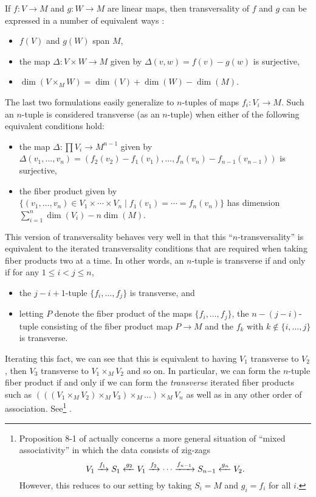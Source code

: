 \begin{remark}
	If $f \colon V \to M$ and $g \colon W \to M$ are linear maps, then transversality of $f$ and $g$ can be expressed in a number of equivalent ways \cite[Section 4.7]{RamBas09}:
	\begin{itemize}
		\item $f(V)$ and $g(W)$ span $M$,
		\item the map $\Delta \colon V \times W \to M$ given by $\Delta(v,w) = f(v)-g(w)$ is surjective,
		\item $\dim(V \times _MW) = \dim(V)+\dim(W)-\dim(M)$.
	\end{itemize}
	The last two formulations easily generalize to $n$-tuples of maps $f_i \colon V_i \to M$.
	Such an $n$-tuple is considered transverse (as an $n$-tuple) when either of the following equivalent conditions hold:
	\begin{itemize}
		\item the map $\Delta \colon \prod V_i \to M^{n-1}$ given by $\Delta(v_1,\ldots,v_n) = (f_2(v_2)-f_1(v_1),\ldots, f_n(v_n)-f_{n-1}(v_{n-1}))$ is surjective,
		\item the fiber product given by $\{(v_1,\ldots,v_n) \in V_1 \times \cdots \times V_n \mid f_1(v_1) = \cdots = f_n(v_n)\}$ has dimension $\sum_{i = 1}^n\dim(V_i) -n\dim(M)$.
	\end{itemize}
	This version of transversality behaves very well in that this ``$n$-transversality'' is equivalent to the iterated transversality conditions that are required when taking fiber products two at a time.
	In other words, an $n$-tuple is transverse if and only if for any $1 \leq i<j \leq n$,
	\begin{itemize}
		\item the $j-i+1$-tuple $\{f_i,\ldots,f_j\}$ is transverse, and
		\item letting $P$ denote the fiber product of the maps $\{f_i,\ldots,f_j\}$, the $n-(j-i)$-tuple consisting of the fiber product map $P \to M$ and the $f_k$ with $k\notin\{i,\ldots,j\}$ is transverse.
	\end{itemize}
	Iterating this fact, we can see that this is equivalent to having $V_1$ transverse to $V_2$, then $V_3$ transverse to $V_1 \times _MV_2$ and so on.
	In particular, we can form the $n$-tuple fiber product if and only if we can form the \textit{transverse} iterated fiber products such as $(((V_1 \times _MV_2) \times _M V_3) \times _M\ldots) \times _M V_n$ as well as in any other order of association.
	See\footnote{Proposition 8-1 of \cite{RamBas09} actually concerns a more general situation of ``mixed associativity'' in which the data consists of zig-zags
	$$V_1 \xrightarrow{f_1}S_1\xleftarrow{g_2}V_1 \xrightarrow{f_2}\cdots \xrightarrow{f_{n-1}}S_{n-1}\xleftarrow{g_n}V_2.$$
	However, this reduces to our setting by taking $S_i = M$ and $g_i = f_i$ for all $i$.}
	\cite[Propositions~4-9 and 8-1]{RamBas09}.


\end{remark}
